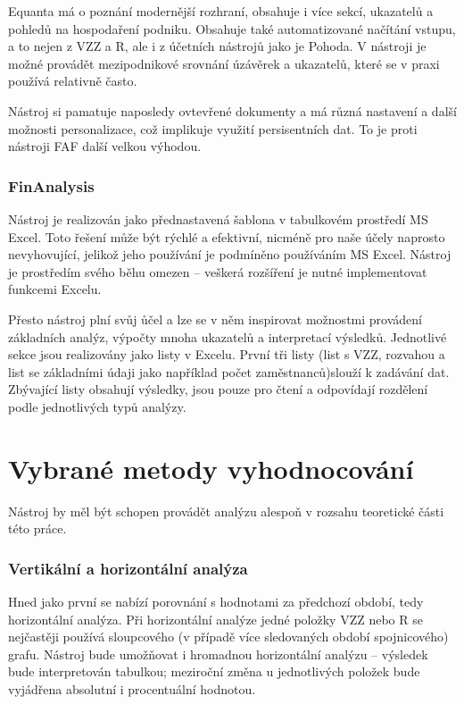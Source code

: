 Equanta má o poznání modernější rozhraní, obsahuje i více sekcí, ukazatelů a pohledů na hospodaření podniku. Obsahuje také automatizované načítání vstupu, a to nejen z VZZ a R, ale i z účetních nástrojů jako je Pohoda. V nástroji je možné provádět mezipodnikové srovnání úzávěrek a ukazatelů, které se v praxi používá relativně často.

Nástroj si pamatuje naposledy ovtevřené dokumenty a má různá nastavení a další možnosti personalizace, což implikuje využití persisentních dat. To je proti nástroji FAF další velkou výhodou. 


\subsubsection{FinAnalysis}
Nástroj je realizován jako přednastavená šablona v tabulkovém prostředí MS Excel. Toto řešení může být rýchlé a efektivní, nicméně pro naše účely naprosto nevyhovující, jelikož jeho používání je podmíněno používáním MS Excel. Nástroj je prostředím svého běhu omezen -- veškerá rozšíření je nutné implementovat funkcemi Excelu.

Přesto nástroj plní svůj ůčel a lze se v něm inspirovat možnostmi provádení základních analýz, výpočty mnoha ukazatelů a interpretací výsledků. Jednotlivé sekce jsou realizovány jako listy v Excelu. První tři listy (list s VZZ, rozvahou a list se základními údaji jako například počet zaměstnanců)slouží k zadávání dat. Zbývající listy obsahují výsledky, jsou pouze pro čtení a odpovídají rozdělení podle jednotlivých typů analýzy.



\section{Vybrané metody vyhodnocování}
Nástroj by měl být schopen provádět analýzu alespoň v rozsahu teoretické části této práce.


\subsubsection{Vertikální a horizontální analýza}
Hned jako první se nabízí porovnání s hodnotami za předchozí období, tedy horizontální analýza. Při horizontální analýze jedné položky VZZ nebo R se nejčastěji používá sloupcového (v případě více sledovaných období spojnicového) grafu. Nástroj bude umožňovat i hromadnou horizontální analýzu -- výsledek bude interpretován tabulkou; meziroční změna u jednotlivých položek bude vyjádřena absolutní i procentuální hodnotou. 

